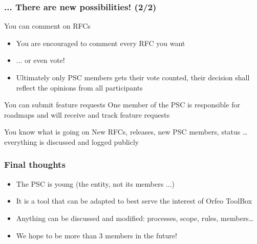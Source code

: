 \documentclass[8pt]{beamer}
\begin{document}
\begin{frame}
\frametitle{... There are new possibilities! (2/2)}

\begin{block}{You can comment on RFCs}
\begin{itemize}
\item You are encouraged to comment every RFC you want
\item ... or even vote!
\item Ultimately only PSC members gets their vote counted, their
  decision shall reflect the opinions from all participants
\end{itemize}
\end{block}

\begin{block}{You can submit feature requests}
One member of the PSC is responsible for roadmaps and will receive and track feature requests
\end{block}

\begin{block}{You know what is going on}
New RFCs, releases, new PSC members, status \ldots everything is discussed and logged publicly
\end{block}
\end{frame}

\begin{frame}
\frametitle{Final thoughts}

\begin{itemize}
\item The PSC is young (the entity, not its members ...)
\item It is a tool that can be adapted to best serve the interest of Orfeo ToolBox
\item Anything can be discussed and modified: processes, scope, rules, members\ldots
\item We hope to be more than 3 members in the future!
\end{itemize}

\end{frame}
\end{document}

